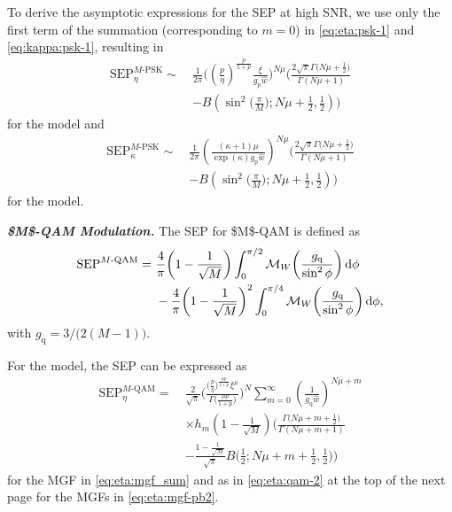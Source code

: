 \documentclass[journal,twocolumn]{IEEEtran}
\begin{document}
To derive the asymptotic expressions for the \ac{SEP} at high \ac{SNR}, we use only the first term of the summation (corresponding to $m=0$) in \eqref{eq:eta:psk-1} and \eqref{eq:kappa:psk-1}, resulting in
\setcounter{equation}{55}
\begin{align}
    \textrm{SEP}^{M\textrm{-PSK}}_{\eta} \sim \ & \frac{1}{2\pi}\bigg( \left(\frac{p}{\eta }\right)^{\frac{p}{1+p}} \frac{\xi}{g_{\textrm{p}} \hat{w}} \bigg)^{N\mu} \Bigg(\frac{2 \sqrt{\pi } \Gamma \big(N \mu +\frac{1}{2}\big)}{\Gamma (N \mu +1)} \nonumber \\
    & -B\left(\sin ^2\bigg(\frac{\pi }{M}\bigg); N \mu +\frac{1}{2},\frac{1}{2}\right)\Bigg) \label{eq:eta:psk-asymp}
\end{align}
for the \Ehm{} model and
\begin{align}
\textrm{SEP}^{M\textrm{-PSK}}_{\kappa} \sim \ & \frac{1}{2\pi}\left(\frac{(\kappa +1) \mu }{\exp(\kappa) g_{\textrm{p}}\hat{w} }\right)^{N \mu } \Bigg(\frac{2 \sqrt{\pi } \Gamma \big(N \mu +\frac{1}{2}\big)}{\Gamma (N \mu +1)} \nonumber \\
    & -B\left(\sin ^2\bigg(\frac{\pi }{M}\bigg); N \mu +\frac{1}{2},\frac{1}{2}\right)\Bigg) \label{eq:kappa:psk-asymp}
\end{align}
for the \km{} model.

\smallskip

\textit{\textbf{\boldmath\ac{$M$-QAM} Modulation.}} The \ac{SEP} for \ac{$M$-QAM} is defined as~\cite[Eq.~(9.21)]{Sim05}
\begin{align}
    \textrm{SEP}^{M\textrm{-QAM}} = \ & \frac{4}{\pi}\left(1-\frac{1}{\sqrt{M}}\right) \int_{0}^{\pi/2}  \mathcal{M}_{W} \left(\frac{g_{\textrm{q}}}{\sin^2 \phi}\right) \diff\phi \nonumber \\
    & - \frac{4}{\pi}\left(1-\frac{1}{\sqrt{M}}\right)^2 \int_{0}^{\pi/4} \mathcal{M}_{W} \left(\frac{g_{\textrm{q}}}{\sin^2 \phi}\right) \diff\phi, \label{eq:qam}
\end{align}
with $g_{\textrm{q}} = 3/\big(2 (M-1)\big)$.

For the \Ehm{} model, the \ac{SEP} can be expressed as
\begin{align}
    \textrm{SEP}^{M\textrm{-QAM}}_{\eta} = \ & \frac{2}{\sqrt{\pi}}\Bigg( \frac{\big(\frac{p}{\eta }\big)^{\frac{\mu  p}{1+p}} \xi^{\mu}}{\Gamma \big(\frac{\mu  p}{1+p}\big)} \Bigg)^{N  } \sum _{m=0}^{\infty } \left(\frac{1}{g_{\textrm{q}}\hat{w}}\right)^{N\mu + m} \nonumber \\ 
    & \times h_m \left(1-\frac{1}{\sqrt{M}}\right)\Bigg( \frac{ \Gamma \big(N \mu + m +\frac{1}{2}\big)}{\Gamma (N \mu + m +1)} \nonumber \\
    & - \frac{1-\frac{1}{\sqrt{M}}}{\sqrt{\pi} } B\bigg(\frac{1}{2};N \mu + m+\frac{1}{2},\frac{1}{2}\bigg)\Bigg) \label{eq:eta:qam-1}
\end{align}
for the \ac{MGF} in \eqref{eq:eta:mgf_sum} and as in \eqref{eq:eta:qam-2} at the top of the next page for the \ac{MGF}s in \eqref{eq:eta:mgf-pb2}.
\end{document}
